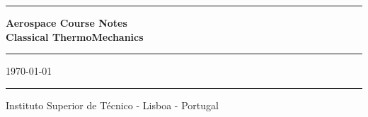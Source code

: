\begin{titlepage}
\begin{center}
\end{center}
\vspace{3cm}
\begin{flushleft}
\end{flushleft}
\hrule height 1.2pt
\vspace{2cm}
\begin{center}
\textbf{\Huge  Aerospace Course Notes \\[5mm] Classical ThermoMechanics}\\[3cm]			
\hrule
\vspace{1.0cm}
\large \today
\end{center}
\hrule height 1.2pt
\vfill
\begin{flushleft}
\footnotesize 
Instituto Superior de T\'ecnico - Lisboa - Portugal \\
\end{flushleft}
\end{titlepage}

